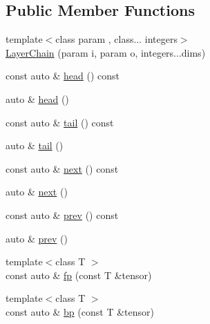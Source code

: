 \subsection*{Public Member Functions}
\begin{DoxyCompactItemize}
\item 
{\footnotesize template$<$class param , class... integers$>$ }\\\hyperlink{structBC_1_1NN_1_1LayerChain_3_01index_00_01derived_00_01front_00_01lst_8_8_8_01_4_af5a2b8083dafb83d5cf4454a0c78793d}{Layer\+Chain} (param i, param o, integers...\+dims)
\item 
const auto \& \hyperlink{structBC_1_1NN_1_1LayerChain_3_01index_00_01derived_00_01front_00_01lst_8_8_8_01_4_a413ef04d3e88467de692e2147ae48f97}{head} () const 
\item 
auto \& \hyperlink{structBC_1_1NN_1_1LayerChain_3_01index_00_01derived_00_01front_00_01lst_8_8_8_01_4_a6f016ad5e2917fecfa5baf97103ec2a0}{head} ()
\item 
const auto \& \hyperlink{structBC_1_1NN_1_1LayerChain_3_01index_00_01derived_00_01front_00_01lst_8_8_8_01_4_a46cb80c46cceee90b84ae3094f577e94}{tail} () const 
\item 
auto \& \hyperlink{structBC_1_1NN_1_1LayerChain_3_01index_00_01derived_00_01front_00_01lst_8_8_8_01_4_a64fbf55390eb0ed0b3c2867dbef140d5}{tail} ()
\item 
const auto \& \hyperlink{structBC_1_1NN_1_1LayerChain_3_01index_00_01derived_00_01front_00_01lst_8_8_8_01_4_a787e487f5e23e36623149ed5ec68830d}{next} () const 
\item 
auto \& \hyperlink{structBC_1_1NN_1_1LayerChain_3_01index_00_01derived_00_01front_00_01lst_8_8_8_01_4_af4a5f3eac5db0d7944a651a26d894665}{next} ()
\item 
const auto \& \hyperlink{structBC_1_1NN_1_1LayerChain_3_01index_00_01derived_00_01front_00_01lst_8_8_8_01_4_ac4c2db6167f0abe4b49e0e9f97afb2f9}{prev} () const 
\item 
auto \& \hyperlink{structBC_1_1NN_1_1LayerChain_3_01index_00_01derived_00_01front_00_01lst_8_8_8_01_4_aaa46e1bc9def488a49225a654f25a129}{prev} ()
\item 
{\footnotesize template$<$class T $>$ }\\const auto \& \hyperlink{structBC_1_1NN_1_1LayerChain_3_01index_00_01derived_00_01front_00_01lst_8_8_8_01_4_aabd72a5912fb67fb51c9a93d7a2a94af}{fp} (const T \&tensor)
\item 
{\footnotesize template$<$class T $>$ }\\const auto \& \hyperlink{structBC_1_1NN_1_1LayerChain_3_01index_00_01derived_00_01front_00_01lst_8_8_8_01_4_aafa18c1c4d114a2bf7d41cdae90e09d1}{bp} (const T \&tensor)

\end{DoxyCompactItemize}
